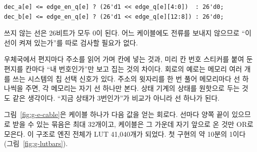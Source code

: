 \begin{lstlisting}[language=SV,numbers=none]
dec_a[e] <= edge_en_q[e] ? (26'd1 << edge_q[e][4:0])  : 26'd0;
dec_b[e] <= edge_en_q[e] ? (26'd1 << edge_q[e][12:8]) : 26'd0;
\end{lstlisting}

쓰지 않는 선은 26비트가 모두 0이 된다. 어느 케이블에도 전류를 보내지 않으므로 ``이 선이 켜져 있는가''를
따로 검사할 필요가 없다.

\General 우체국에서 편지마다 주소를 읽어 가며 칸에 넣는 것과, 미리 칸 번호 스티커를 붙여 둔 편지를 칸마다
``내 번호인가''만 보고 집는 것의 차이다. 회로의 예로는 메모리 여러 개를 쓰는 시스템의 칩 선택 신호가 있다.
주소의 윗자리를 한 번 풀어 메모리마다 선 하나씩을 주면, 각 메모리는 자기 선 하나만 본다. 상태 기계의 상태를
원핫으로 두는 것도 같은 생각이다. ``지금 상태가 3번인가''가 비교가 아니라 선 하나가 된다.

\Ours 그림~\ref{fig:g-e-cable}은 케이블 하나가 다음 값을 얻는 회로다. 선마다 양쪽 끝이 있으므로 받을 수
있는 묶음은 최대 32개이고, 케이블은 그 가운데 자기 앞으로 온 것만 OR로 모은다. 이 구조로 엔진 전체가
LUT 41,040개가 되었다. 첫 구현의 약 10분의 1이다(그림~\ref{fig:g-lutbars}).

